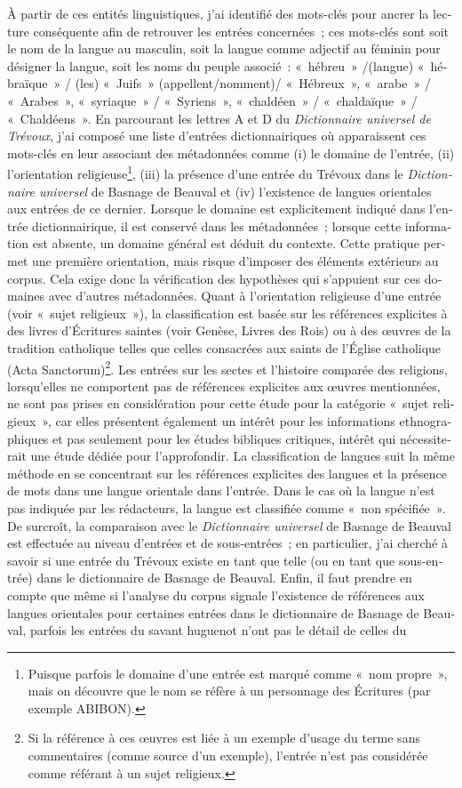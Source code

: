 \documentclass[output=paper,colorlinks,citecolor=brown,arabicfont,chinesefont,booklanguage=french]{langscibook}
\begin{document}
\begin{otherlanguage}{french}
À partir de ces entités linguistiques, j’ai identifié des mots-clés pour ancrer la lecture conséquente afin de retrouver les entrées concernées~; ces mots-clés sont soit le nom de la langue au masculin, soit la langue comme adjectif au féminin pour désigner la langue, soit les noms du peuple associé~: «~hébreu~» /(langue) «~hébraïque~» / (les) «~Juifs~» (appellent/nomment)/ «~Hébreux~», «~arabe~» / «~Arabes~», «~syriaque~» / «~Syriens~», «~chaldéen~»  / «~chaldaïque~» / «~Chaldéens~». En parcourant les lettres A et D du \emph{Dictionnaire universel de Trévoux}, j’ai composé une liste d’entrées dictionnairiques où apparaissent ces mots-clés en leur associant des métadonnées comme (i) le domaine de l’entrée, (ii) l’orientation religieuse\footnote{Puisque parfois le domaine d’une entrée est marqué comme «~nom propre~», mais on découvre que le nom se réfère à un personnage des Écritures (par exemple ABIBON).}, (iii) la présence d’une entrée du Trévoux dans le \emph{Dictionnaire universel} de Basnage de Beauval et (iv) l’existence de langues orientales aux entrées de ce dernier. Lorsque le domaine est explicitement indiqué dans l’entrée dictionnairique, il est conservé dans les métadonnées~; lorsque cette information est absente, un domaine général est déduit du contexte. Cette pratique permet une première orientation, mais risque d’imposer des éléments extérieurs au corpus. Cela exige donc la vérification des hypothèses qui s’appuient sur ces domaines avec d’autres métadonnées. Quant à l’orientation religieuse d’une entrée (voir «~sujet religieux~»), la classification est basée sur les références explicites à des livres d’Écritures saintes (voir Genèse, Livres des Rois) ou à des œuvres de la tradition catholique telles que celles consacrées aux saints de l’Église catholique (Acta Sanctorum)\footnote{Si la référence à ces œuvres est liée à un exemple d’usage du terme sans commentaires (comme source d’un exemple), l’entrée n’est pas considérée comme référant à un sujet religieux.}. Les entrées sur les sectes et l’histoire comparée des religions, lorsqu’elles ne comportent pas de références explicites aux œuvres mentionnées, ne sont pas prises en considération pour cette étude pour la catégorie «~sujet religieux~», car elles présentent également un intérêt pour les informations ethnographiques et pas seulement pour les études bibliques critiques, intérêt qui nécessiterait une étude dédiée pour l’approfondir. La classification de langues suit la même méthode en se concentrant sur les références explicites des langues et la présence de mots dans une langue orientale dans l’entrée. Dans le cas où la langue n’est pas indiquée par les rédacteurs, la langue est classifiée comme «~non spécifiée~». De surcroît, la comparaison avec le \emph{Dictionnaire universel} de Basnage de Beauval est effectuée au niveau d’entrées et de sous-entrées~; en particulier, j’ai cherché à savoir si une entrée du Trévoux existe en tant que telle (ou en tant que sous-entrée) dans le dictionnaire de Basnage de Beauval. Enfin, il faut prendre en compte que même si l’analyse du corpus signale l’existence de références aux langues orientales pour certaines entrées dans le dictionnaire de Basnage de Beauval, parfois les entrées du savant huguenot n’ont pas le détail de celles du 
\end{otherlanguage}
\end{document}
